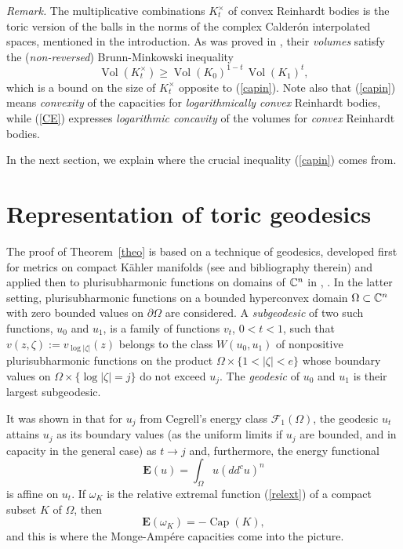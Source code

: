 \documentclass[12pt]{article}
\newcommand{\beq}{\begin{equation}}
\newcommand{\eeq}{\end{equation}}
\numberwithin{equation}{section}
\newcommand{\Vol}{{\operatorname{Vol}}}
\newcommand{\Capa}{{\operatorname{Cap}}}
\newcommand{\BE}{{\mathbf E}}
\newcommand{\Cn}{{\mathbb  C\sp n}}
\newcommand{\F}{{\mathcal F}}
\begin{document}
\medskip
{\it Remark.} The multiplicative combinations $K_t^\times$ of convex Reinhardt bodies is the toric version of the balls in the norms of the complex Calder\'{o}n interpolated spaces, mentioned in the introduction. As was proved in \cite{CE}, their {\sl volumes} satisfy the ({\sl non-reversed}) Brunn-Minkowski inequality
\beq\label{CE} \Vol(K_t^\times) \ge \Vol(K_0)^{1-t}\,\Vol(K_1)^{t},\eeq
which is a bound on the size of $K_t^\times$ opposite to (\ref{capin}). Note also that (\ref{capin}) means {\sl convexity} of the capacities for {\sl logarithmically convex} Reinhardt bodies, while (\ref{CE}) expresses  {\sl logarithmic concavity} of the volumes for {\sl convex} Reinhardt bodies.

\medskip
In the next section, we explain where the crucial inequality (\ref{capin}) comes from.


\section{Representation of toric geodesics}

The proof of Theorem~\ref{theo} is based on a technique of geodesics, developed first for metrics on compact K\"{a}hler manifolds (see \cite{G12} and bibliography therein) and applied then to plurisubharmonic functions on domains of $\Cn$ in \cite{R16}, \cite{Ho}. In the latter setting, plurisubharmonic functions on a bounded hyperconvex domain $\Omega\subset\Cn$ with zero bounded values on $\partial\Omega$ are considered. A {\it subgeodesic} of two such functions, $u_0$ and $u_1$, is a family of functions $v_t$, $0<t<1$, such that $v(z,\zeta):=v_{\log|\zeta|}(z)$ belongs to the class $W(u_0,u_1)$ of nonpositive plurisubharmonic functions on the product $\Omega\times\{1<|\zeta|<e\}$ whose boundary values on $\Omega\times\{\log|\zeta|=j\}$ do not exceed $u_j$. The {\it geodesic} of $u_0$ and $u_1$ is their largest subgeodesic.

It was shown in \cite{R16} that for $u_j$ from Cegrell's energy class $\F_1(\Omega)$, the geodesic $u_t$ attains $u_j$ as its boundary values (as the uniform limits if $u_j$ are bounded, and in capacity in the general case) as $t\to j$ and, furthermore, the energy functional
$$\BE(u)= \int_\Omega u(dd^c u)^n$$ is affine on $u_t$. If $\omega_K$ is the relative extremal function (\ref{relext}) of a compact subset $K$ of $\Omega$, then $$\BE(\omega_K)=-\Capa (K),$$ and this is where the Monge-Amp\'ere capacities come into the picture.
\end{document}
